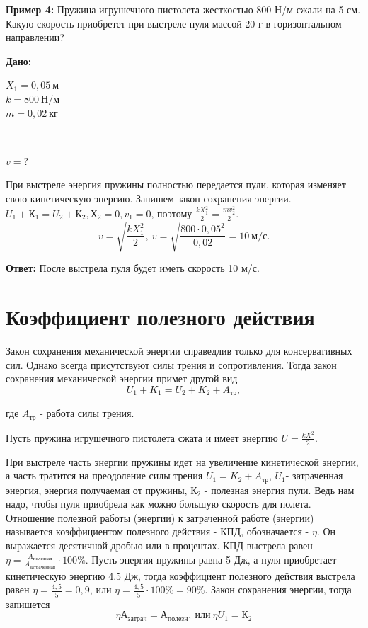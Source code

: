 \documentclass[a6paper, 11pt]{diss_4}
\renewcommand{\'}{\,'}
\begin{document}
\textbf{Пример 4:} Пружина игрушечного пистолета жесткостью 800 Н/м сжали на 5 см. Какую скорость приобретет при выстреле пуля массой 20 г в горизонтальном направлении?

\hspace{1cm}\textbf{Дано:}\hspace{.3cm}
\parbox[t]{4cm}{
$X_1= 0,05\ м$\\
$k= 800\ Н/м$\\
$m=0,02\ кг$\\
\rule{4cm}{.4pt}\\
$v = ?$\\
}

При выстреле энергия пружины полностью передается пули, которая изменяет свою кинетическую энергию. Запишем закон сохранения энергии.  $U_1+К_1=U_2+К_2,  Х_2=0,  v_1=0$,  поэтому $\frac{kX^2_1}{2}=\frac{mv_2^2}{2}$.
\[
v=\sqrt{\frac{kX^2_1}{2}},\
v=\sqrt{\frac{800\cdot0,05^2}{0,02}}=10\ м/с.
\]

\textbf{Ответ:} После выстрела пуля будет иметь скорость 10 м/с.

\section{Коэффициент полезного действия}

Закон сохранения механической энергии справедлив только для консервативных сил. Однако всегда присутствуют силы трения и сопротивления. Тогда закон сохранения механической энергии примет другой вид
\[
U_1+K_1=U_2+K_2+A_{тр},
\]

где $A_{тр}$ - работа силы трения.

Пусть пружина игрушечного пистолета сжата и имеет энергию $U=\frac{kX^2}{2}$.

При  выстреле часть энергии пружины идет на увеличение кинетической энергии, а часть тратится на преодоление силы трения $U_1=K_2+ A_{тр}$, $U_1$- затраченная энергия, энергия получаемая от пружины, $К_2$ - полезная энергия пули. Ведь нам надо, чтобы пуля приобрела как можно большую скорость для полета. Отношение полезной работы (энергии) к затраченной работе (энергии) называется коэффициентом полезного действия - КПД, обозначается - $\eta$. Он выражается десятичной дробью или в процентах. КПД выстрела равен $\eta=\frac{A_{полезная}}{A_{затраченная}}\cdot100\%$. Пусть энергия пружины равна 5 Дж, а пуля приобретает кинетическую энергию 4.5 Дж, тогда коэффициент полезного действия выстрела равен $\eta=\frac{4,5}{5}=0,9$, или $\eta=\frac{4,5}{5}\cdot100\%=90\%$. Закон сохранения энергии, тогда запишется
\[
\eta А_{затрач}= А_{полезн},\ или\ \eta U_1=К_2
\]
\end{document}
